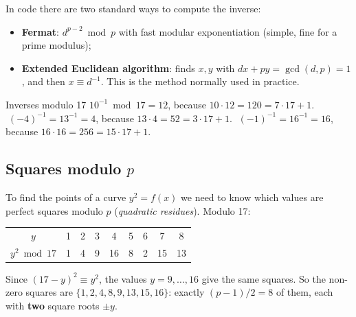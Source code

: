 In code there are two standard ways to compute the inverse:
\begin{itemize}
  \item \textbf{Fermat}: $d^{p-2} \bmod p$ with fast modular exponentiation (simple, fine for a prime modulus);
  \item \textbf{Extended Euclidean algorithm}: finds $x, y$ with $d x + p y = \gcd(d,p) = 1$, and then $x \equiv d^{-1}$. This is the method normally used in practice.
\end{itemize}

\begin{framedex}{Inverses modulo 17}
  $10^{-1} \bmod 17 = 12$, because $10 \cdot 12 = 120 = 7 \cdot 17 + 1$.
  $\;(-4)^{-1} = 13^{-1} = 4$, because $13 \cdot 4 = 52 = 3 \cdot 17 + 1$.
  $\;(-1)^{-1} = 16^{-1} = 16$, because $16 \cdot 16 = 256 = 15 \cdot 17 + 1$.
\end{framedex}


\subsection{Squares modulo $p$}

To find the points of a curve $y^2 = f(x)$ we need to know which values are perfect squares modulo $p$ (\textit{quadratic residues}). Modulo 17:
\begin{center}
  \begin{tabular}{c|cccccccc}
    \toprule
    $y$ & 1 & 2 & 3 & 4 & 5 & 6 & 7 & 8 \\
    $y^2 \bmod 17$ & 1 & 4 & 9 & 16 & 8 & 2 & 15 & 13 \\
    \bottomrule
  \end{tabular}
\end{center}
Since $(17 - y)^2 \equiv y^2$, the values $y = 9, \ldots, 16$ give the same squares. So the non-zero squares are $\{1, 2, 4, 8, 9, 13, 15, 16\}$: exactly $(p-1)/2 = 8$ of them, each with \textbf{two} square roots $\pm y$.
